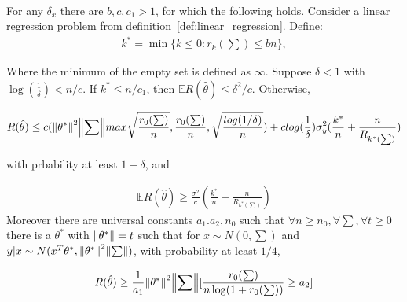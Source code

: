 \documentclass[a4paper,12pt]{scrartcl}
\theoremstyle{definition}
\begin{document}
\begin{thm}\ \\
	For any $\delta_x$ there are $b,c,c_1 > 1$, for which the following holds. Consider a linear regression problem from definition~\ref{def:linear_regression}. Define:
\begin{equation}
\begin{aligned}
k^* = \min \{k \leq 0: r_k(\sum) \leq bn\},
\end{aligned}
\end{equation}

Where the minimum of the empty set is defined as $\infty$. Suppose $\delta < 1$ with $\log(\frac{1}{\delta}) < n/c$. If $k^* \leq n/c_1$, then $\mathbb{E}R(\hat{\theta}) \leq \delta^2/c.$ Otherwise,

\begin{equation}
\begin{aligned}
R(\hat{\theta}) \leq c(\norm{\theta^*}^2\norm{\sum}max{\sqrt{\frac{r_0(\sum)}{n}},\frac{r_0(\sum)}{n},\sqrt{\frac{log(1/\delta)}{n}}}) + clog(\frac{1}{\delta})\sigma_y^2(\frac{k^*}{n} + \frac{n}{R_{k^*(\sum)}}) \\
\end{aligned}
\end{equation}

with prbability at least $1 - \delta$, and 

\begin{equation}
\begin{aligned}
\mathbb{E}R(\hat{\theta}) \geq \frac{\sigma^2}{c} (\frac{k^*}{n} + \frac{n}{R_{k^*(\sum)}}) 
\end{aligned}
\end{equation}
Moreover there are universal constants $a_1.a_2,n_0$ such that $\forall n \geq n_0, \forall \sum, \forall t \geq 0$ there is a $\theta^*$ with $\norm{\theta^*} = t$ such that for $x \sim N(0,\sum)$ and $y|x \sim N(x^T\theta^*,\norm{\theta^*}^2\norm{\sum})$, with probability at least $1/4$,

\begin{equation}
\begin{aligned}
R(\hat{\theta})\geq \frac{1}{a_1}\norm{\theta^*}^2\norm{\sum}[\frac{r_0(\sum)}{n\log(1+r_0(\sum))} \geq a_2]
\end{aligned}
\end{equation}
 
\end{thm}
\end{document}
